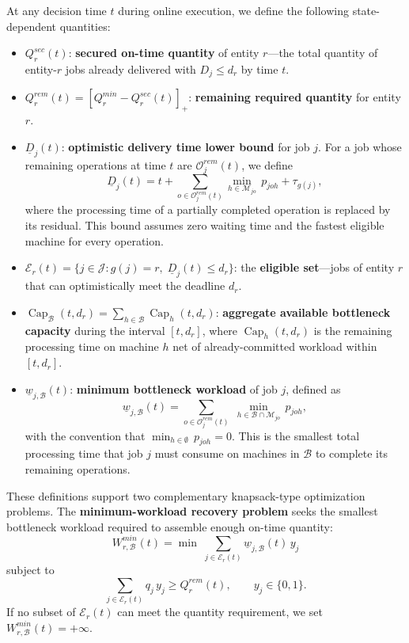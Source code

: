 At any decision time $t$ during online execution, we define the following state-dependent quantities:

\begin{itemize}
    \item $Q_r^{sec}(t)$: \textbf{secured on-time quantity} of entity $r$---the total quantity of entity-$r$ jobs already delivered with $D_j\le d_r$ by time $t$.
    \item $Q_r^{rem}(t)=[Q_r^{min}-Q_r^{sec}(t)]_+$: \textbf{remaining required quantity} for entity $r$.
    \item $\underline D_j(t)$: \textbf{optimistic delivery time lower bound} for job $j$. For a job whose remaining operations at time $t$ are $\mathcal O_j^{rem}(t)$, we define
    \begin{equation}\label{eq:opt_delivery}
    \underline D_j(t)=t+\sum_{o\in\mathcal O_j^{rem}(t)}\min_{h\in\mathcal M_{jo}}\,p_{joh}+\tau_{g(j)},
    \end{equation}
    where the processing time of a partially completed operation is replaced by its residual. This bound assumes zero waiting time and the fastest eligible machine for every operation.
    \item $\mathcal E_r(t)=\{j\in\mathcal J:g(j)=r,\;\underline D_j(t)\le d_r\}$: the \textbf{eligible set}---jobs of entity $r$ that can optimistically meet the deadline $d_r$.
    \item $\operatorname{Cap}_{\mathcal B}(t,d_r)=\sum_{h\in\mathcal B}\operatorname{Cap}_h(t,d_r)$: \textbf{aggregate available bottleneck capacity} during the interval $[t,d_r]$, where $\operatorname{Cap}_h(t,d_r)$ is the remaining processing time on machine $h$ net of already-committed workload within $[t,d_r]$.
    \item $\underline w_{j,\mathcal B}(t)$: \textbf{minimum bottleneck workload} of job $j$, defined as
    \begin{equation}\label{eq:min_bottleneck_work}
    \underline w_{j,\mathcal B}(t)=\sum_{o\in\mathcal O_j^{rem}(t)}\;\min_{h\in\mathcal B\cap\mathcal M_{jo}}\,p_{joh},
    \end{equation}
    with the convention that $\min_{h\in\emptyset}\,p_{joh}=0$. This is the smallest total processing time that job $j$ must consume on machines in $\mathcal B$ to complete its remaining operations.
\end{itemize}

These definitions support two complementary knapsack-type optimization problems. The \textbf{minimum-workload recovery problem} seeks the smallest bottleneck workload required to assemble enough on-time quantity:
\begin{equation}\label{eq:min_workload}
W_{r,\mathcal B}^{min}(t)=
\min\;\sum_{j\in\mathcal E_r(t)}\underline w_{j,\mathcal B}(t)\,y_j
\end{equation}
subject to
\begin{equation}
\sum_{j\in\mathcal E_r(t)}q_j\,y_j\ge Q_r^{rem}(t),\qquad y_j\in\{0,1\}.
\end{equation}
If no subset of $\mathcal E_r(t)$ can meet the quantity requirement, we set $W_{r,\mathcal B}^{min}(t)=+\infty$.

